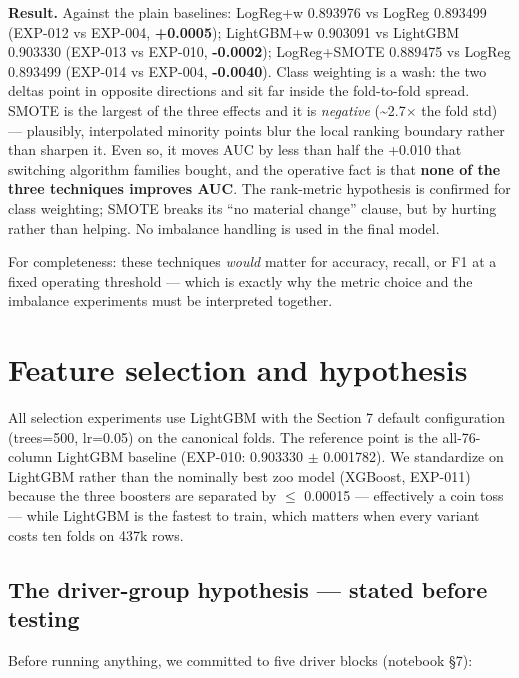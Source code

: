 \documentclass[11pt,a4paper]{article}
\begin{document}
{\textbf{Result.} Against the plain baselines: LogReg+w 0.893976 vs LogReg 0.893499 (EXP-012 vs EXP-004, \textbf{+0.0005}); LightGBM+w 0.903091 vs LightGBM 0.903330 (EXP-013 vs EXP-010, \textbf{-0.0002}); LogReg+SMOTE 0.889475 vs LogReg 0.893499 (EXP-014 vs EXP-004, \textbf{-0.0040}). Class weighting is a wash: the two deltas point in opposite directions and sit far inside the fold-to-fold spread. SMOTE is the largest of the three effects and it is \emph{negative} (\textasciitilde2.7$\times$ the fold std) --- plausibly, interpolated minority points blur the local ranking boundary rather than sharpen it. Even so, it moves AUC by less than half the +0.010 that switching algorithm families bought, and the operative fact is that \textbf{none of the three techniques improves AUC}. The rank-metric hypothesis is confirmed for class weighting; SMOTE breaks its ``no material change'' clause, but by hurting rather than helping. No imbalance handling is used in the final model.

For completeness: these techniques \emph{would} matter for accuracy, recall, or F1 at a fixed operating threshold --- which is exactly why the metric choice and the imbalance experiments must be interpreted together.

\section{Feature selection and hypothesis}\label{feature-selection-and-hypothesis}

All selection experiments use LightGBM with the Section 7 default configuration (trees=500, lr=0.05) on the canonical folds. The reference point is the all-76-column LightGBM baseline (EXP-010: 0.903330 $\pm$ 0.001782). We standardize on LightGBM rather than the nominally best zoo model (XGBoost, EXP-011) because the three boosters are separated by $\le$ 0.00015 --- effectively a coin toss --- while LightGBM is the fastest to train, which matters when every variant costs ten folds on 437k rows.

\subsection{The driver-group hypothesis --- stated before testing}\label{the-driver-group-hypothesis-stated-before-testing}

Before running anything, we committed to five driver blocks (notebook \S{}7):

}
\end{document}
